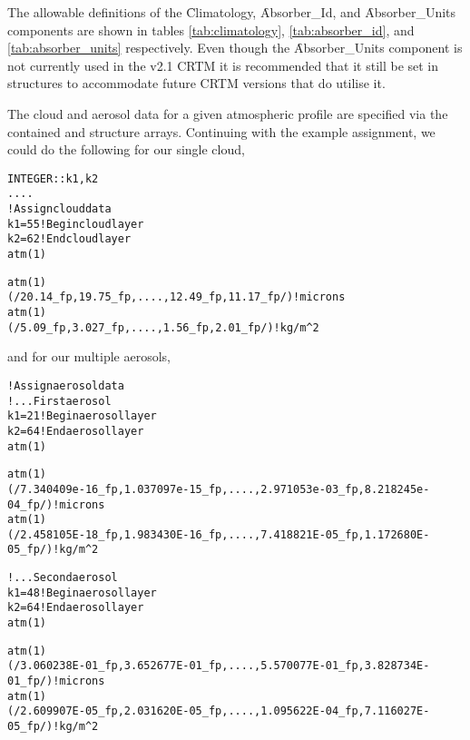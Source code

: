 The allowable definitions of the \f{Climatology}, \f{Absorber\_Id}, and \f{Absorber\_Units} components are shown in tables \ref{tab:climatology}, \ref{tab:absorber_id}, and \ref{tab:absorber_units} respectively. Even though the \f{Absorber\_Units} component is not currently used in the v2.1 CRTM it is recommended that it still be set in \hyperref[sec:atmosphere_structure]{\Atmosphere} structures to accommodate future CRTM versions that do utilise it.


The cloud and aerosol data for a given atmospheric profile are specified via the contained \hyperref[sec:cloud_structure]{\Cloud} and \hyperref[sec:aerosol_structure]{\Aerosol} structure arrays. Continuing with the example assignment, we could do the following for our single cloud,

\begin{alltt}
  INTEGER :: k1, k2
  ....
  ! Assign cloud data
  k1 = 55  ! Begin cloud layer
  k2 = 62  ! End cloud layer
  atm(1)%\textcolor{red}{Cloud(1)}%\textcolor{magenta}{Type} = WATER_CLOUD

  atm(1)%\textcolor{red}{Cloud(1)}%\textcolor{magenta}{Effective_Radius(k1:k2)} = &
    (/ 20.14_fp, 19.75_fp, .... , 12.49_fp, 11.17_fp /)  ! microns
  atm(1)%\textcolor{red}{Cloud(1)}%\textcolor{magenta}{Water_Content(k1:k2)}    = &
    (/ 5.09_fp, 3.027_fp, .... , 1.56_fp, 2.01_fp /)     ! kg/m^2\end{alltt}

and for our multiple aerosols,

\begin{alltt}
  ! Assign aerosol data
  ! ...First aerosol
  k1 = 21  ! Begin aerosol layer
  k2 = 64  ! End aerosol layer
  atm(1)%\textcolor{red}{Aerosol(1)}%\textcolor{magenta}{Type} = DUST_AEROSOL

  atm(1)%\textcolor{red}{Aerosol(1)}%\textcolor{magenta}{Effective_Radius(k1:k2)} = &
    (/7.340409e-16_fp, 1.037097e-15_fp, .... , 2.971053e-03_fp, 8.218245e-04_fp/) ! microns
  atm(1)%\textcolor{red}{Aerosol(1)}%\textcolor{magenta}{Concentration(k1:k2)} = &
    (/2.458105E-18_fp, 1.983430E-16_fp, .... , 7.418821E-05_fp, 1.172680E-05_fp/) ! kg/m^2

  ! ...Second aerosol
  k1 = 48  ! Begin aerosol layer
  k2 = 64  ! End aerosol layer
  atm(1)%\textcolor{red}{Aerosol(2)}%\textcolor{magenta}{Type} = SULFATE_AEROSOL

  atm(1)%\textcolor{red}{Aerosol(2)}%\textcolor{magenta}{Effective_Radius(k1:k2)} = &
    (/3.060238E-01_fp, 3.652677E-01_fp, .... , 5.570077E-01_fp, 3.828734E-01_fp/) ! microns
  atm(1)%\textcolor{red}{Aerosol(2)}%\textcolor{magenta}{Concentration(k1:k2)} = &
    (/2.609907E-05_fp, 2.031620E-05_fp, .... , 1.095622E-04_fp, 7.116027E-05_fp/) ! kg/m^2\end{alltt}

